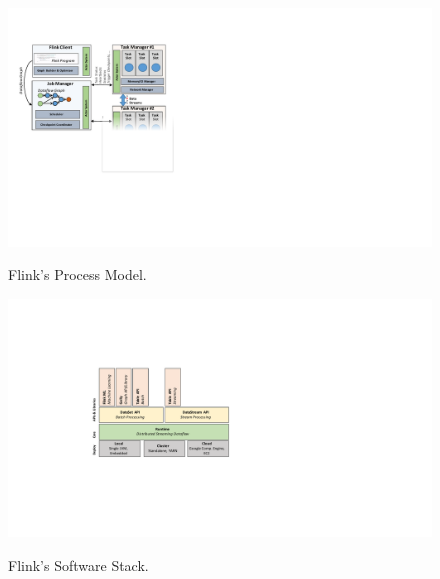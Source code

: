 \begin{figure}
\centering
\begin{minipage}{.52\textwidth}
\centering
	\includegraphics[width=.9\textwidth]{figs/architecture.pdf}
    \caption{Flink's Process Model.}
    \label{fig:process-model}
\end{minipage}%
\begin{minipage}{0.52\textwidth}
\centering
\includegraphics[width=.8\textwidth]{figs/stack.pdf}
\label{fig:FlinkStack}
\caption{Flink's Software Stack.}
\end{minipage}
\end{figure}




